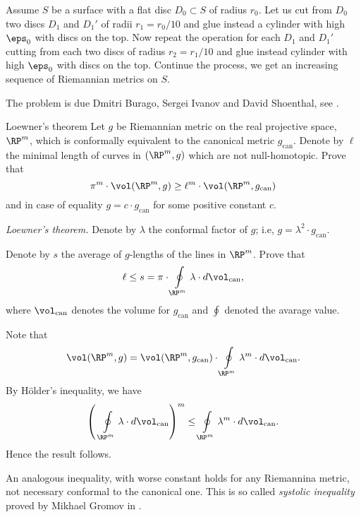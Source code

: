 Assume $S$ be a surface with a flat disc $D_0\subset S$ of radius $r_0$.
Let us cut from $D_0$ two discs $D_1$ and $D_1'$ 
of radii $r_1=r_0/10$ and glue instead a cylinder with high $\eps_0$ 
with discs on the top.
Now repeat the operation for each $D_1$ and $D_1'$ cutting 
from each two discs of radius $r_2=r_1/10$
and glue instead cylinder with high $\eps_0$ 
with discs on the top.
Continue the process, we get an increasing sequence of Riemannian metrics on $S$.

The problem is due
Dmitri Burago, 
Sergei Ivanov 
and David Shoenthal,
see \cite{BIS}.














\begin{pr}{}{Loewner's theorem}
\label{Loewner's theorem}
Let $g$ be Riemannian metric
on the real projective space, $\RP^m$,
which is
conformally equivalent to the canonical metric $g_{\text{can}}$.
Denote by $\ell$ the minimal length of curves in $(\RP^m,g)$ which are not null-homotopic. 
Prove that 
$$\pi^m\cdot\vol(\RP^m,g)
\ge 
\ell^m
\cdot
\vol(\RP^m,g_{\text{can}})$$ 
and in case of equality $g=c\cdot g_{\text{can}}$ for some positive constant $c$.
\end{pr}

\textit{Loewner's theorem.}
Denote by $\lambda$ the conformal factor of $g$;
i.e, $g=\lambda^2\cdot g_{\mathrm{can}}$.

Denote by $s$ the average of $g$-lengths of the lines in $\RP^m$.
Prove that 
\[\ell \le s=\pi\cdot\oint\limits_{\RP^m}\lambda\cdot d\vol_{\mathrm{can}},\]
where $\vol_{\mathrm{can}}$ denotes the volume for $g_{\mathrm{can}}$ and $\oint$ denoted the avarage value.

Note that
\[\vol(\RP^m,g)
=
\vol(\RP^m,g_{\mathrm{can}})
\cdot
\oint\limits_{\RP^m}\lambda^m\cdot d\vol_{\mathrm{can}}.\]
By H\"older's inequality, we have
\[\left(\,\,\oint\limits_{\RP^m}\lambda\cdot d\vol_{\mathrm{can}}\right)^m
\le \oint\limits_{\RP^m}\lambda^m\cdot d\vol_{\mathrm{can}}.\]
Hence the result follows.

An analogous inequality,
with worse constant holds for any Riemannina metric, 
not necessary conformal to the canonical one.
This is so called \emph{systolic inequality} proved by Mikhael Gromov in \cite{gromov-filling}.



















